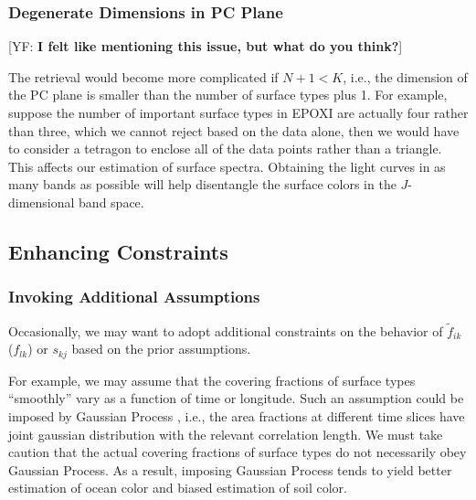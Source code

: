 \documentclass[iop,numberedappendix,apj]{emulateapj}
\def\fast{\tilde f}
\def\memoYF#1{\color{red}[YF: {\bf #1}]\color{black}}
\begin{document}
\subsubsection{Degenerate Dimensions in PC Plane}

\memoYF{I felt like mentioning this issue, but what do you think?}

The retrieval would become more complicated if $N + 1 < K$, i.e., the dimension of the PC plane is smaller than the number of surface types plus 1. 
For example, suppose the number of important surface types in EPOXI are actually four rather than three, which we cannot reject based on the data alone, then we would have to consider a tetragon to enclose all of the data points rather than a triangle. 
This affects our estimation of surface spectra. 
Obtaining the light curves in as many bands as possible will help disentangle the surface colors in the $J$-dimensional band space. 


\subsection{Enhancing Constraints}
\label{ss:enhancing_constraints}

\subsubsection{Invoking Additional Assumptions}

Occasionally, we may want to adopt additional constraints on the behavior of $\fast _{ik}$ ($f_{lk}$) or $s_{kj}$ based on the prior assumptions. 

For example, we may assume that the covering fractions of surface types  ``smoothly'' vary as a function of time or longitude. 
Such an assumption could be imposed by Gaussian Process \citep[e.g.,][]{Rasmussen2005}, i.e., the area fractions at different time slices have joint gaussian distribution with the relevant correlation length. 
We must take caution that the actual covering fractions of surface types do not necessarily obey Gaussian Process. 
As a result, imposing Gaussian Process tends to yield better estimation of ocean color and biased estimation of soil color. 
\end{document}
